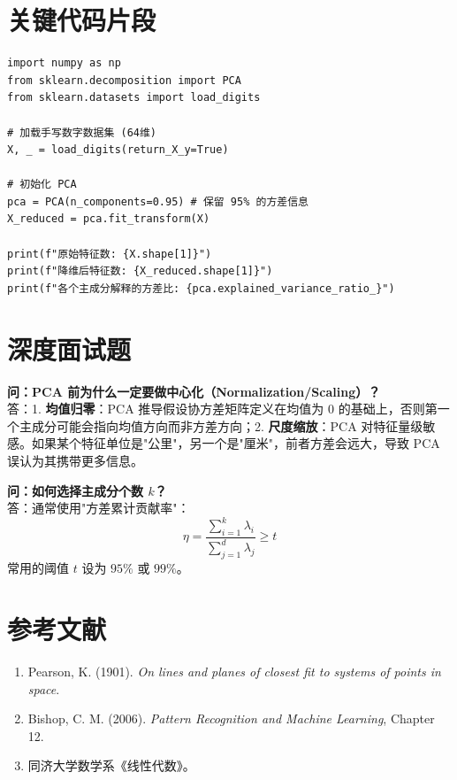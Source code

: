 \documentclass[12pt, a4paper]{article}
\begin{document}
\section{关键代码片段}
\begin{lstlisting}
import numpy as np
from sklearn.decomposition import PCA
from sklearn.datasets import load_digits

# 加载手写数字数据集 (64维)
X, _ = load_digits(return_X_y=True)

# 初始化 PCA
pca = PCA(n_components=0.95) # 保留 95% 的方差信息
X_reduced = pca.fit_transform(X)

print(f"原始特征数: {X.shape[1]}")
print(f"降维后特征数: {X_reduced.shape[1]}")
print(f"各个主成分解释的方差比: {pca.explained_variance_ratio_}")
\end{lstlisting}

\section{深度面试题}

\textbf{问：PCA 前为什么一定要做中心化（Normalization/Scaling）？}\\
答：1. \textbf{均值归零}：PCA 推导假设协方差矩阵定义在均值为 0 的基础上，否则第一个主成分可能会指向均值方向而非方差方向；2. \textbf{尺度缩放}：PCA 对特征量级敏感。如果某个特征单位是"公里"，另一个是"厘米"，前者方差会远大，导致 PCA 误认为其携带更多信息。

\textbf{问：如何选择主成分个数 $k$？}\\
答：通常使用"方差累计贡献率"：
$$ \eta = \frac{\sum_{i=1}^k \lambda_i}{\sum_{j=1}^d \lambda_j} \geq t $$
常用的阈值 $t$ 设为 $95\%$ 或 $99\%$。

\section{参考文献}
\begin{enumerate}
    \item Pearson, K. (1901). \textit{On lines and planes of closest fit to systems of points in space}.
    \item Bishop, C. M. (2006). \textit{Pattern Recognition and Machine Learning}, Chapter 12.
    \item 同济大学数学系《线性代数》。
\end{enumerate}
\end{document}
